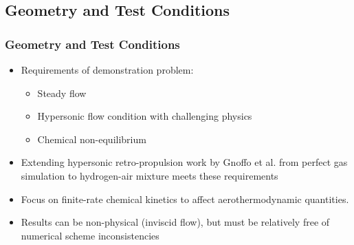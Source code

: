\documentclass{beamer}
\begin{document}
\subsection{Geometry and Test Conditions}
\begin{frame}
  \frametitle{Geometry and Test Conditions}
  \begin{itemize}
    \item Requirements of demonstration problem:
      \begin{itemize}
        \item Steady flow
        \item Hypersonic flow condition with challenging physics
        \item Chemical non-equilibrium
      \end{itemize}
    \item Extending hypersonic retro-propulsion work by Gnoffo et al. from
      perfect gas simulation to hydrogen-air mixture meets these requirements
    \item Focus on finite-rate chemical kinetics to affect aerothermodynamic
      quantities.
    \item Results can be non-physical (inviscid flow), but must be relatively
      free of numerical scheme inconsistencies
  \end{itemize}
\end{frame}
\end{document}
